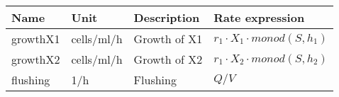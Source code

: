   \begin{tabular}{llll}\hline
    \textbf{Name} & \textbf{Unit} & \textbf{Description} & \textbf{Rate expression} \\ \hline
    growthX1 & cells/ml/h & Growth of X1 & $r_1 \cdot  X_1 \cdot  monod(S, h_1)$ \\
    growthX2 & cells/ml/h & Growth of X2 & $r_1 \cdot  X_2 \cdot  monod(S, h_2)$ \\
    flushing & 1/h & Flushing & $Q / V$ \\ \hline
  \end{tabular}

